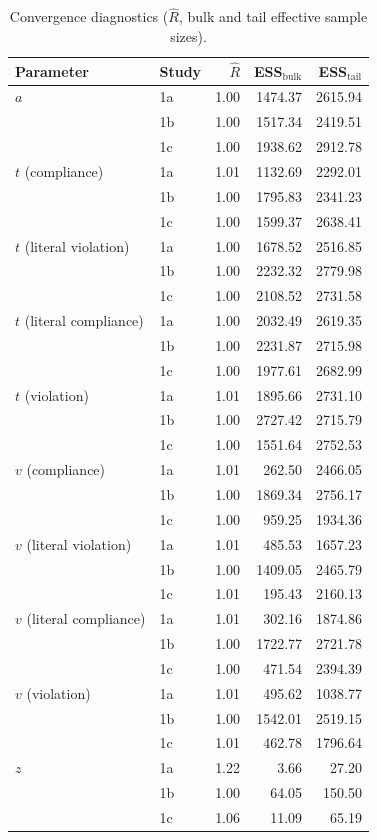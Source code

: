 \documentclass[pdflatex,sn-nature]{sn-jnl}
\begin{document}
\begin{appendices}
\begin{table}[htbp]
\caption{Convergence diagnostics ($\hat{R}$, bulk and tail effective sample sizes).}
\label{tab:S3}
\begin{tabular*}{\textwidth}{@{\extracolsep{\fill}}llrrr@{}}
\toprule
Parameter & Study & $\hat{R}$ & ESS$_\text{bulk}$ & ESS$_\text{tail}$ \\
\midrule
$a$ & 1a & 1.00 & 1474.37 & 2615.94 \\
    & 1b & 1.00 & 1517.34 & 2419.51 \\
    & 1c & 1.00 & 1938.62 & 2912.78 \\
$t$ (compliance) & 1a & 1.01 & 1132.69 & 2292.01 \\
                  & 1b & 1.00 & 1795.83 & 2341.23 \\
                  & 1c & 1.00 & 1599.37 & 2638.41 \\
$t$ (literal violation) & 1a & 1.00 & 1678.52 & 2516.85 \\
                         & 1b & 1.00 & 2232.32 & 2779.98 \\
                         & 1c & 1.00 & 2108.52 & 2731.58 \\
$t$ (literal compliance) & 1a & 1.00 & 2032.49 & 2619.35 \\
                          & 1b & 1.00 & 2231.87 & 2715.98 \\
                          & 1c & 1.00 & 1977.61 & 2682.99 \\
$t$ (violation) & 1a & 1.01 & 1895.66 & 2731.10 \\
                 & 1b & 1.00 & 2727.42 & 2715.79 \\
                 & 1c & 1.00 & 1551.64 & 2752.53 \\
$v$ (compliance) & 1a & 1.01 & 262.50  & 2466.05 \\
                  & 1b & 1.00 & 1869.34 & 2756.17 \\
                  & 1c & 1.00 & 959.25  & 1934.36 \\
$v$ (literal violation) & 1a & 1.01 & 485.53  & 1657.23 \\
                         & 1b & 1.00 & 1409.05 & 2465.79 \\
                         & 1c & 1.01 & 195.43  & 2160.13 \\
$v$ (literal compliance) & 1a & 1.01 & 302.16  & 1874.86 \\
                          & 1b & 1.00 & 1722.77 & 2721.78 \\
                          & 1c & 1.00 & 471.54  & 2394.39 \\
$v$ (violation) & 1a & 1.01 & 495.62  & 1038.77 \\
                 & 1b & 1.00 & 1542.01 & 2519.15 \\
                 & 1c & 1.01 & 462.78  & 1796.64 \\
$z$ & 1a & 1.22 & 3.66    & 27.20   \\
    & 1b & 1.00 & 64.05   & 150.50  \\
    & 1c & 1.06 & 11.09   & 65.19   \\
\bottomrule
\end{tabular*}
\end{table}


\end{appendices}
\end{document}
